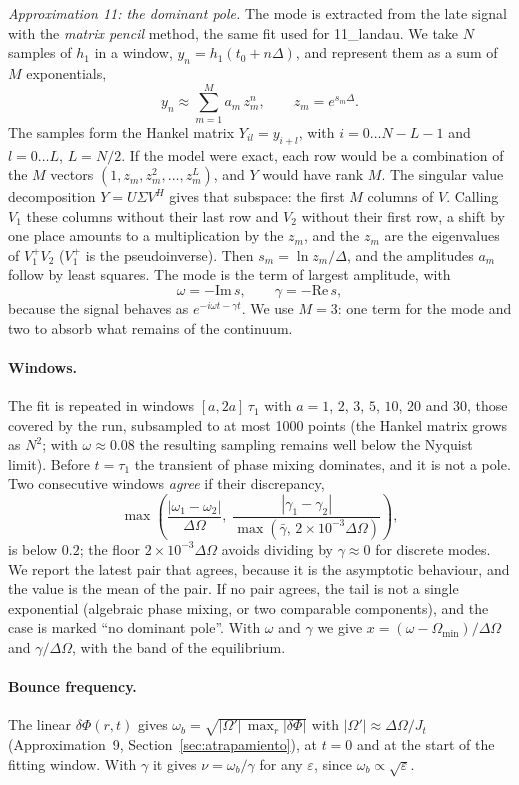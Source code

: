 \documentclass[11pt,a4paper]{article}
\begin{document}
\emph{Approximation 11: the dominant pole.} The mode is extracted from the late signal
with the \emph{matrix pencil} method, the same fit used for 11\_landau. We take $N$ samples
of $h_1$ in a window, $y_n=h_1(t_0+n\Delta)$, and represent them as a sum of $M$ exponentials,
\[
  y_n \approx \sum_{m=1}^{M} a_m\,z_m^n,\qquad z_m=e^{s_m\Delta}.
\]
The samples form the Hankel matrix $Y_{il}=y_{i+l}$, with $i=0\ldots N-L-1$ and $l=0\ldots L$,
$L=N/2$. If the model were exact, each row would be a combination of the $M$ vectors
$(1,z_m,z_m^2,\ldots,z_m^L)$, and $Y$ would have rank $M$. The singular value decomposition
$Y=U\Sigma V^H$ gives that subspace: the first $M$ columns of $V$. Calling $V_1$ these columns
without their last row and $V_2$ without their first row, a shift by one place amounts to
a multiplication by the $z_m$, and the $z_m$ are the eigenvalues of $V_1^+V_2$ ($V_1^+$ is the
pseudoinverse). Then $s_m=\ln z_m/\Delta$, and the amplitudes $a_m$ follow by least squares.
The mode is the term of largest amplitude, with
\[
  \omega=-\mathrm{Im}\,s,\qquad \gamma=-\mathrm{Re}\,s ,
\]
because the signal behaves as $e^{-i\omega t-\gamma t}$. We use $M=3$: one term for the mode and two
to absorb what remains of the continuum.

\paragraph{Windows.} The fit is repeated in windows $[a,2a]\,\tau_1$ with $a=1$, $2$, $3$, $5$, $10$,
$20$ and $30$, those covered by the run, subsampled to at most 1000 points (the Hankel
matrix grows as $N^2$; with $\omega\approx0.08$ the resulting sampling remains well below the Nyquist
limit). Before $t=\tau_1$ the transient of phase mixing dominates, and it is not a pole. Two
consecutive windows \emph{agree} if their discrepancy,
\[
  \max\!\left(\frac{|\omega_1-\omega_2|}{\Delta\Omega},\;
  \frac{|\gamma_1-\gamma_2|}{\max(\bar\gamma,\,2\times10^{-3}\Delta\Omega)}\right),
\]
is below $0.2$; the floor $2\times10^{-3}\Delta\Omega$ avoids dividing by $\gamma\approx0$ for discrete modes. We
report the latest pair that agrees, because it is the asymptotic behaviour, and the value
is the mean of the pair. If no pair agrees, the tail is not a single exponential
(algebraic phase mixing, or two comparable components), and the case is marked ``no
dominant pole''. With $\omega$ and $\gamma$ we give $x=(\omega-\Omega_{\min})/\Delta\Omega$ and $\gamma/\Delta\Omega$, with the band
of the equilibrium.

\paragraph{Bounce frequency.} The linear $\delta\Phi(r,t)$ gives
$\omega_b=\sqrt{|\Omega'|\,\max_r|\delta\Phi|}$ with $|\Omega'|\approx\Delta\Omega/J_t$ (Approximation~9,
Section~\ref{sec:atrapamiento}), at $t=0$ and at the start of the fitting window. With $\gamma$
it gives $\nu=\omega_b/\gamma$ for any $\varepsilon$, since $\omega_b\propto\sqrt\varepsilon$.
\end{document}
